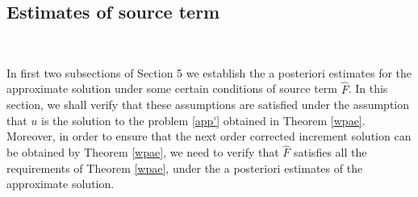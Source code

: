 \documentclass{amsart}
\numberwithin{equation}{section}
\begin{document}
\subsection{Estimates of source term}~

In first two subsections of Section 5 we establish the a posteriori estimates for the approximate solution under some certain conditions of source term $\hat{F}$. In this section, we shall verify that these assumptions are satisfied under the assumption that $u$ is the solution to the problem \eqref{app'} obtained in Theorem \ref{wpae}. Moreover, in order to ensure that the next order corrected increment solution can be obtained by Theorem \ref{wpae}, we need to verify that $\hat{F}$ satisfies all the requirements of Theorem \ref{wpae}, under the a posteriori estimates of the approximate solution.
\end{document}

